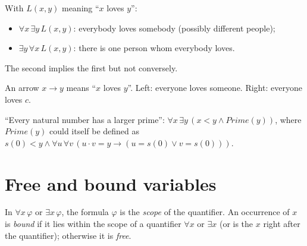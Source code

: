 \begin{example}
With $L(x,y)$ meaning ``$x$ loves $y$'':
\begin{itemize}
  \item $\forall x\,\exists y\,L(x,y)$: everybody loves somebody (possibly different
        people);
  \item $\exists y\,\forall x\,L(x,y)$: there is one person whom everybody loves.
\end{itemize}
The second implies the first but not conversely.
\end{example}
\begin{center}

\small An arrow $x\to y$ means ``$x$ loves $y$''. Left: everyone loves someone. Right: everyone loves $c$.
\end{center}

\begin{example}
``Every natural number has a larger prime'':
$\forall x\,\exists y\,(x<y\land \mathit{Prime}(y))$, where $\mathit{Prime}(y)$ could
itself be defined as
$s(0)<y\land\forall u\,\forall v\,(u\cdot v=y\to(u=s(0)\lor v=s(0)))$.
\end{example}

\section{Free and bound variables}

\begin{definition}
In $\forall x\,\varphi$ or $\exists x\,\varphi$, the formula $\varphi$ is the \emph{scope}
of the quantifier. An occurrence of $x$ is \emph{bound} if it lies within the scope of a
quantifier $\forall x$ or $\exists x$ (or is the $x$ right after the quantifier);
otherwise it is \emph{free}.
\end{definition}

